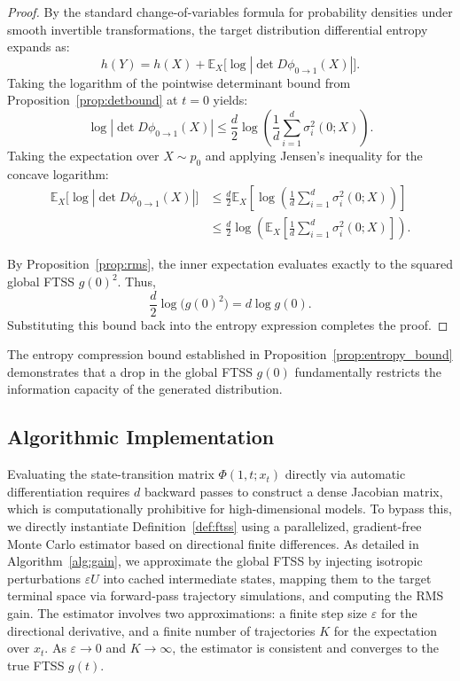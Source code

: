 \documentclass[11pt]{article}
\begin{document}
\begin{proof}
By the standard change-of-variables formula for probability densities under smooth invertible transformations, the target distribution differential entropy expands as:
\[
h(Y) = h(X) + \mathbb{E}_{X}\bigl[\log |\det D\phi_{0\to 1}(X)|\bigr].
\]
Taking the logarithm of the pointwise determinant bound from Proposition~\ref{prop:detbound} at $t=0$ yields:
\[
\log |\det D\phi_{0\to 1}(X)| \le \frac{d}{2} \log\left(\frac{1}{d} \sum_{i=1}^d \sigma_i^2(0; X)\right).
\]
Taking the expectation over $X \sim p_0$ and applying Jensen's inequality for the concave logarithm:
\begin{align*}
\mathbb{E}_{X}\bigl[\log |\det D\phi_{0\to 1}(X)|\bigr]
&\le \frac{d}{2} \mathbb{E}_{X}\left[\log\left(\frac{1}{d} \sum_{i=1}^d \sigma_i^2(0; X)\right)\right] \\
&\le \frac{d}{2} \log\left(\mathbb{E}_{X}\left[\frac{1}{d} \sum_{i=1}^d \sigma_i^2(0; X)\right]\right).
\end{align*}

By Proposition~\ref{prop:rms}, the inner expectation evaluates exactly to the squared global FTSS $g(0)^2$. Thus,
\[
\frac{d}{2} \log\bigl(g(0)^2\bigr) = d \log g(0).
\]
Substituting this bound back into the entropy expression completes the proof.
\end{proof}

The entropy compression bound established in Proposition~\ref{prop:entropy_bound} demonstrates that a drop in the global FTSS $g(0)$ fundamentally restricts the information capacity of the generated distribution.

\subsection{Algorithmic Implementation}
\label{sec:estimation}

Evaluating the state-transition matrix $\Phi(1,t; x_t)$ directly via automatic differentiation requires $d$ backward passes to construct a dense Jacobian matrix, which is computationally prohibitive for high-dimensional models. To bypass this, we directly instantiate Definition~\ref{def:ftss} using a parallelized, gradient-free Monte Carlo estimator based on directional finite differences. As detailed in Algorithm~\ref{alg:gain}, we approximate the global FTSS by injecting isotropic perturbations $\varepsilon U$ into cached intermediate states, mapping them to the target terminal space via forward-pass trajectory simulations, and computing the RMS gain. The estimator involves two approximations: a finite step size $\varepsilon$ for the directional derivative, and a finite number of trajectories $K$ for the expectation over $x_t$. As $\varepsilon \to 0$ and $K \to \infty$, the estimator is consistent and converges to the true FTSS $g(t)$.
\end{document}
